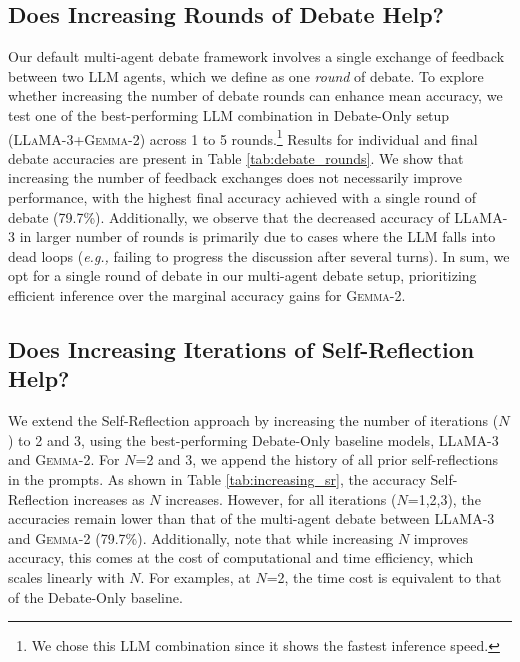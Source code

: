 \documentclass[11pt]{article}
\begin{document}
\subsection{Does Increasing Rounds of Debate Help?}
\label{appendix:increasing_rounds}
Our default multi-agent debate framework involves a single exchange of feedback between two LLM agents, which we define as one \textit{round} of debate. To explore whether increasing the number of debate rounds can enhance mean accuracy, we test one of the best-performing LLM combination in Debate-Only setup (\textsc{LLaMA-3}+\textsc{Gemma-2}) across 1 to 5 rounds.\footnote{We chose this LLM combination since it shows the fastest inference speed.} Results for individual and final debate accuracies are present in Table \ref{tab:debate_rounds}. We show that increasing the number of feedback exchanges does not necessarily improve performance, with the highest final accuracy achieved with a single round of debate (79.7\%). Additionally, we observe that the decreased accuracy of \textsc{LLaMA-3} in larger number of rounds is primarily due to cases where the LLM falls into dead loops (\textit{e.g.,} failing to progress the discussion after several turns). In sum, we opt for a single round of debate in our multi-agent debate setup, prioritizing efficient inference over the marginal accuracy gains for \textsc{Gemma-2}.





\subsection{Does Increasing Iterations of Self-Reflection Help?}
\label{appendix:increasing_sr}
We extend the Self-Reflection approach by increasing the number of iterations ($N$) to 2 and 3, using the best-performing Debate-Only baseline models, \textsc{LLaMA-3} and \textsc{Gemma-2}. For $N$=2 and 3, we append the history of all prior self-reflections in the prompts. As shown in Table \ref{tab:increasing_sr}, the accuracy Self-Reflection increases as $N$ increases. However, for all iterations ($N$=1,2,3), the accuracies remain lower than that of the multi-agent debate between \textsc{LLaMA-3} and \textsc{Gemma-2} (79.7\%). Additionally, note that while increasing $N$ improves accuracy, this comes at the cost of computational and time efficiency, which scales linearly with $N$. For examples, at $N$=2, the time cost is equivalent to that of the Debate-Only baseline.
\end{document}
